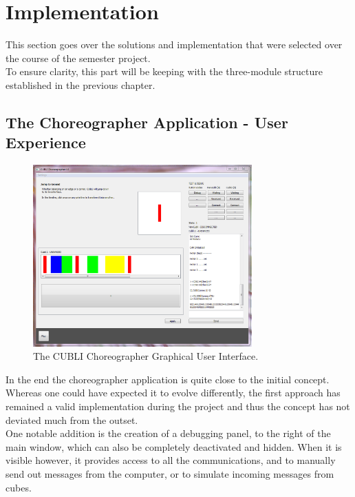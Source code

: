 \chapter{Implementation}\label{sec:implementation}

This section goes over the solutions and implementation that were selected over the course of the semester project. \\

To ensure clarity, this part will be keeping with the three-module  structure established in the previous chapter. 

\section{The Choreographer Application - User Experience}

\begin{figure}[ht]
   \centering
   \includegraphics[width=0.75\textwidth]{img/ChoreographerGUI.png}
   \caption{The CUBLI Choreographer Graphical User Interface.}
   \label{img:ChoreographerGUI}
\end{figure}

In the end the choreographer application is quite close to the initial concept. Whereas one could have expected it to evolve differently, the first approach has remained a valid implementation during the project and thus the concept has not deviated much from the outset.\\

One notable addition is the creation of a debugging panel, to the right of the main window, which can also be completely deactivated and hidden. When it is visible however, it provides access to all the communications, and to manually send out messages from the computer, or to simulate incoming messages from cubes.\\

